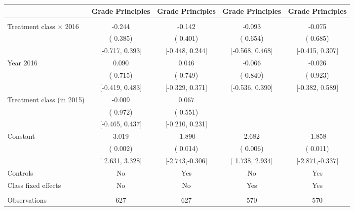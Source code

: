 \begin{tabular}{lcccc} \toprule
& Grade Principles & Grade Principles & Grade Principles & Grade Principles \tabularnewline \midrule
&  &  &  & \tabularnewline
Treatment class $\times$ 2016 & -0.244 & -0.142 & -0.093 & -0.075\tabularnewline
& ( 0.385) & ( 0.401) & ( 0.654) & ( 0.685)\tabularnewline
& {[}-0.717, 0.393{]} & {[}-0.448, 0.244{]} & {[}-0.568, 0.468{]} & {[}-0.415, 0.307{]}\tabularnewline
Year 2016  &  0.090 &  0.046 & -0.066 & -0.026\tabularnewline
& ( 0.715) & ( 0.749) & ( 0.840) & ( 0.923)\tabularnewline
& {[}-0.419, 0.483{]} & {[}-0.329, 0.371{]} & {[}-0.536, 0.390{]} & {[}-0.382, 0.589{]}\tabularnewline
Treatment class (in 2015) & -0.009 &  0.067 &   &  \tabularnewline
& ( 0.972) & ( 0.551) &   &  \tabularnewline
& {[}-0.465, 0.437{]} & {[}-0.210, 0.231{]} &     &  \tabularnewline
Constant  &  3.019 & -1.890 &  2.682 & -1.858\tabularnewline
& ( 0.002) & ( 0.014) & ( 0.006) & ( 0.011)\tabularnewline
& {[} 2.631, 3.328{]} & {[}-2.743,-0.306{]} & {[} 1.738, 2.934{]} & {[}-2.871,-0.337{]}\tabularnewline
Controls & No & Yes & No & Yes\tabularnewline
Class fixed effects & No & No & Yes & Yes\tabularnewline
&  &  &  & \tabularnewline
Observations & 627 & 627 & 570 & 570\tabularnewline
\bottomrule \bottomrule
\end{tabular}

